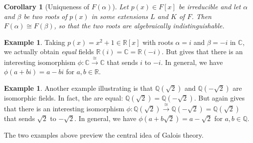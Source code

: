\documentclass[12pt]{report}
\newtheorem{corollary}[theorem]{Corollary}
\numberwithin{equation}{section}
\numberwithin{theorem}{chapter}
\theoremstyle{definition}
\newtheorem{example}[theorem]{Example}
\newtheorem*{basic properties}{Basic Properties}
\newtheorem*{Important Remark}{Important Remark}
\newcommand{\R}{\mathbb{R}}
\newcommand{\Q}{\mathbb{Q}}
\newcommand{\C}{\mathbb{C}}
\begin{document}
\begin{corollary}[Uniqueness of $F(\alpha)$]\label{uniqueness of F(alpha) roots}
Let $p(x)\in F[x]$ be irreducible and let $\alpha$ and $\beta$ be two roots of $p(x)$ in some extensions $L$ and $K$ of $F$. Then $F(\alpha) \cong F(\beta)$, so that the two roots are algebraically indistinguishable.
\end{corollary}



\begin{example}
Taking $p(x)=x^2+1 \in \R[x]$ with roots $\alpha = i$ and $\beta=-i$ in $\C$, we actually obtain {\em equal} fields $\R(i)=\C=\R(-i)$.
But  gives that there is an interesting isomorphism $\phi: \C \xrightarrow{\, \cong \,} \C$ that sends $i$ to $-i$. In general, we have $\phi(a + b i) = a - bi$ for $a,b \in \R$.
\end{example}

\begin{example} 
Another example illustrating  is that $\Q(\sqrt{2})$ and $\Q(-\sqrt{2})$ are isomorphic fields. In fact, the are equal: $\Q(\sqrt2) = \Q(-\sqrt{2})$. But again  gives that there is an interesting isomorphism $\phi: \Q(\sqrt{2}) \xrightarrow{\, \cong \,} \Q(-\sqrt{2}) = \Q(\sqrt{2})$ that sends $\sqrt{2}$ to $-\sqrt{2}$. In general, we have $\phi(a + b \sqrt{2}) = a - \sqrt{2}$ for $a,b \in \Q$.
\end{example}


The two examples above preview the central idea of Galois theory.
\end{document}
